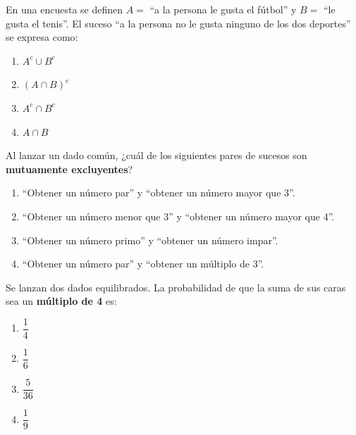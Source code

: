 \documentclass[12pt, a4paper]{article} %
\begin{document}
\begin{enumerate}[leftmargin=*]
    \begin{minipage}{\linewidth}
    \item En una encuesta se definen $A = $ ``a la persona le gusta el fútbol'' y $B = $ ``le gusta el tenis''. El suceso ``a la persona no le gusta ninguno de los dos deportes'' se expresa como:
    \begin{enumerate}
        \item $A^c \cup B^c$
        \item $(A \cap B)^c$
        \item $A^c \cap B^c$
        \item $A \cap B$
    \end{enumerate}
    \end{minipage}
    \vspace{0.5cm}

    \begin{minipage}{\linewidth}
    \item Al lanzar un dado común, ¿cuál de los siguientes pares de sucesos son \textbf{mutuamente excluyentes}?
    \begin{enumerate}
        \item ``Obtener un número par'' y ``obtener un número mayor que 3''.
        \item ``Obtener un número menor que 3'' y ``obtener un número mayor que 4''.
        \item ``Obtener un número primo'' y ``obtener un número impar''.
        \item ``Obtener un número par'' y ``obtener un múltiplo de 3''.
    \end{enumerate}
    \end{minipage}
    \vspace{0.5cm}

    \begin{minipage}{\linewidth}
    \item Se lanzan dos dados equilibrados. La probabilidad de que la suma de sus caras sea un \textbf{múltiplo de 4} es:
    \begin{enumerate}
        \item $\dfrac{1}{4}$
        \item $\dfrac{1}{6}$
        \item $\dfrac{5}{36}$
        \item $\dfrac{1}{9}$
    \end{enumerate}
    \end{minipage}
    \vspace{0.5cm}


\end{enumerate}
\end{document}
